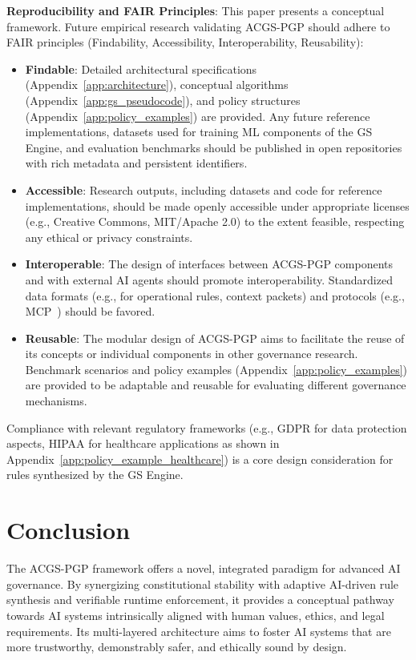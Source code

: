 \documentclass[sigconf,review,anonymous=false]{acmart} %
\begin{document}
\textbf{Reproducibility and FAIR Principles}: This paper presents a conceptual framework. Future empirical research validating ACGS-PGP should adhere to FAIR principles (Findability, Accessibility, Interoperability, Reusability):
\begin{itemize}
    \item \textbf{Findable}: Detailed architectural specifications (Appendix~\ref{app:architecture}), conceptual algorithms (Appendix~\ref{app:gs_pseudocode}), and policy structures (Appendix~\ref{app:policy_examples}) are provided. Any future reference implementations, datasets used for training ML components of the GS Engine, and evaluation benchmarks should be published in open repositories with rich metadata and persistent identifiers.
    \item \textbf{Accessible}: Research outputs, including datasets and code for reference implementations, should be made openly accessible under appropriate licenses (e.g., Creative Commons, MIT/Apache 2.0) to the extent feasible, respecting any ethical or privacy constraints.
    \item \textbf{Interoperable}: The design of interfaces between ACGS-PGP components and with external AI agents should promote interoperability. Standardized data formats (e.g., for operational rules, context packets) and protocols (e.g., MCP~\cite{ModelContextProtocolGitHub}) should be favored.
    \item \textbf{Reusable}: The modular design of ACGS-PGP aims to facilitate the reuse of its concepts or individual components in other governance research. Benchmark scenarios and policy examples (Appendix~\ref{app:policy_examples}) are provided to be adaptable and reusable for evaluating different governance mechanisms.
\end{itemize}
Compliance with relevant regulatory frameworks (e.g., GDPR for data protection aspects, HIPAA for healthcare applications as shown in Appendix~\ref{app:policy_example_healthcare}) is a core design consideration for rules synthesized by the GS Engine.

\section{Conclusion}
\label{sec:conclusion}
The ACGS-PGP framework offers a novel, integrated paradigm for advanced AI governance. By synergizing constitutional stability with adaptive AI-driven rule synthesis and verifiable runtime enforcement, it provides a conceptual pathway towards AI systems intrinsically aligned with human values, ethics, and legal requirements. Its multi-layered architecture aims to foster AI systems that are more trustworthy, demonstrably safer, and ethically sound by design.
\end{document}
